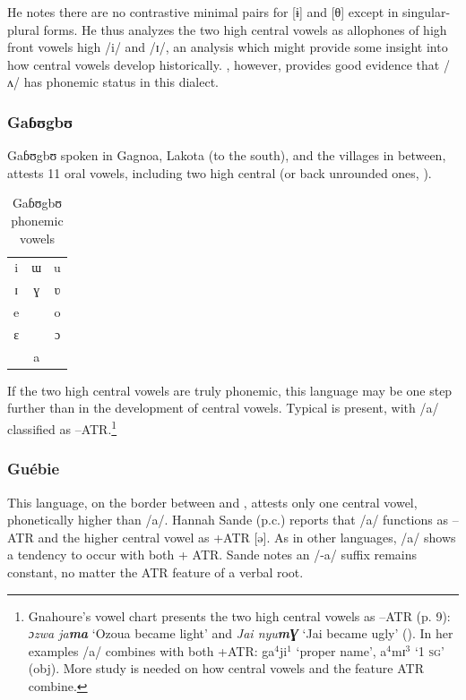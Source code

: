\documentclass[output=paper,newtxmath,modfonts,nonflat,draft]{langsci/langscibook}
\begin{document}
He notes there are no contrastive minimal pairs for [ɨ] and [θ] except in sin\-gular-plu\-ral forms. He thus analyzes the two high central vowels as allophones of high front vowels high /i/ and /ɪ/, an analysis which might provide some insight into how central vowels develop historically. \citet{Vahoua2011}, however, provides good evidence that /ʌ/ has phonemic status in this dialect.    

\subsubsection{Gaɓʊgbʊ}
Gaɓʊgbʊ spoken in Gagnoa, Lakota (to the south), and the villages in between, attests 11 oral vowels, including two high central (or back unrounded ones, \citealt[5, 9]{Gnahore2006}). 

\begin{table}
	\caption{Gaɓʊgbʊ phonemic vowels}
	\label{tab:zogbo:13}
	\begin{tabular}{ccc}
i  &  ɯ  &   u\\

ɪ    & ɣ &   ʋ\\

e    & &   o\\

ɛ    & &  ɔ\\

	& a\\
	\end{tabular}
\end{table}


If the two high central vowels are truly phonemic, this language may be one step further than  in the development of central vowels. Typical  is present, with /a/ classified as –ATR.\footnote{Gnahoure’s vowel chart presents the two high central vowels as –ATR (p. 9): \textit{ɔzwa ja}\textbf{\textit{ma}} ‘Ozoua became light’ and \textit{Jai nyu}\textbf{\textit{m}}\textbf{\textit{Ɣ}} ‘Jai became ugly’ (\citeyear[25]{Gnahore2006}).  In her examples /a/ combines with both +ATR:  ga$^4$ji$^1$ ‘proper name’, a$^4$mɪ$^3$ ‘1 \textsc{sg}’ (obj).  More study is needed on how central vowels and the feature ATR combine.} 

\subsubsection{Guébie}
This language, on the border between  and , attests only one central vowel, phonetically higher than /a/. Hannah Sande (p.c.) reports that /a/ functions as –ATR and the higher central vowel as +ATR [ə].  As in other  languages, /a/ shows a tendency to occur with both + ATR.  Sande notes an /-a/ suffix remains constant, no matter the ATR feature of a verbal root. 
\end{document}
